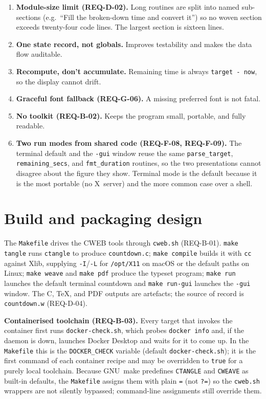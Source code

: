 \documentclass[12pt]{article}
\newcommand{\code}[1]{\texttt{#1}}
\begin{document}
\begin{enumerate}[noitemsep]
  \item \textbf{Module-size limit (REQ-D-02).}  Long routines are split
        into named sub-sections (e.g.\ ``Fill the broken-down time and
        convert it'') so no woven section exceeds twenty-four code lines.
        The largest section is sixteen lines.
  \item \textbf{One state record, not globals.}  Improves testability and
        makes the data flow auditable.
  \item \textbf{Recompute, don't accumulate.}  Remaining time is always
        \code{target - now}, so the display cannot drift.
  \item \textbf{Graceful font fallback (REQ-G-06).}  A missing preferred
        font is not fatal.
  \item \textbf{No toolkit (REQ-B-02).}  Keeps the program small,
        portable, and fully readable.
  \item \textbf{Two run modes from shared code (REQ-F-08, REQ-F-09).}  The
        terminal default and the \code{-gui} window reuse the same
        \code{parse\_target}, \code{remaining\_secs}, and
        \code{fmt\_duration} routines, so the two presentations cannot
        disagree about the figure they show.  Terminal mode is the default
        because it is the most portable (no X~server) and the more common
        case over a shell.
\end{enumerate}

\section{Build and packaging design}

The \code{Makefile} drives the CWEB tools through \code{cweb.sh}
(REQ-B-01).  \code{make tangle} runs \code{ctangle} to produce
\code{countdown.c}; \code{make compile} builds it with \code{cc} against
Xlib, supplying \code{-I}/\code{-L} for \code{/opt/X11} on macOS or the
default paths on Linux; \code{make weave} and \code{make pdf} produce the
typeset program; \code{make run} launches the default terminal countdown
and \code{make run-gui} launches the \code{-gui} window.  The C, \TeX, and
PDF outputs are artefacts; the source of record is \code{countdown.w}
(REQ-D-04).

\medskip\noindent
\textbf{Containerised toolchain (REQ-B-03).}  Every target that invokes
the container first runs \code{docker-check.sh}, which probes
\code{docker info} and, if the daemon is down, launches Docker Desktop and
waits for it to come up.  In the \code{Makefile} this is the
\code{DOCKER\_CHECK} variable (default \code{docker-check.sh}); it is the
first command of each container recipe and may be overridden to \code{true}
for a purely local toolchain.  Because GNU~make predefines \code{CTANGLE}
and \code{CWEAVE} as built-in defaults, the \code{Makefile} assigns them
with plain \code{=} (not \code{?=}) so the \code{cweb.sh} wrappers are not
silently bypassed; command-line assignments still override them.
\end{document}
